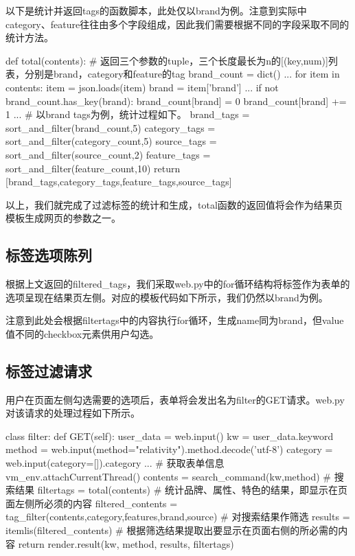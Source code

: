 以下是统计并返回tags的函数脚本，此处仅以brand为例。注意到实际中category、feature往往由多个字段组成，因此我们需要根据不同的字段采取不同的统计方法。

\begin{python}
def total(contents):
    # 返回三个参数的tuple，三个长度最长为n的[(key,num)]列表，分别是brand，category和feature的tag
    brand_count = dict()
    ...
    for item in contents:
        item = json.loads(item)
        brand = item['brand']
        ...
        if not brand_count.has_key(brand):
            brand_count[brand] = 0
        brand_count[brand] += 1
        ...
    # 以brand tags为例，统计过程如下。
    brand_tags = sort_and_filter(brand_count,5)
    category_tags = sort_and_filter(category_count,5)
    source_tags = sort_and_filter(source_count,2)
    feature_tags = sort_and_filter(feature_count,10)
    return [brand_tags,category_tags,feature_tags,source_tags]
\end{python}

以上，我们就完成了过滤标签的统计和生成，total函数的返回值将会作为结果页模板生成网页的参数之一。


\subsection{标签选项陈列}

根据上文返回的filtered\_tags，我们采取web.py中的for循环结构将标签作为表单的选项呈现在结果页左侧。对应的模板代码如下所示，我们仍然以brand为例。


注意到此处会根据filtertags中的内容执行for循环，生成name同为brand，但value值不同的checkbox元素供用户勾选。

\subsection{标签过滤请求}

用户在页面左侧勾选需要的选项后，表单将会发出名为filter的GET请求。web.py对该请求的处理过程如下所示。

\begin{python}
class filter:
    def GET(self):
        user_data = web.input()
        kw = user_data.keyword
        method = web.input(method="relativity").method.decode('utf-8')
        category = web.input(category=[]).category
        ... # 获取表单信息
        vm_env.attachCurrentThread()
        contents = search_command(kw,method) # 搜索结果
        filtertags = total(contents) # 统计品牌、属性、特色的结果，即显示在页面左侧所必须的内容
        filtered_contents = tag_filter(contents,category,features,brand,source)
                                     # 对搜索结果作筛选
        results = itemlis(filtered_contents) # 根据筛选结果提取出要显示在页面右侧的所必需的内容
        return render.result(kw, method, results, filtertags)
\end{python}

